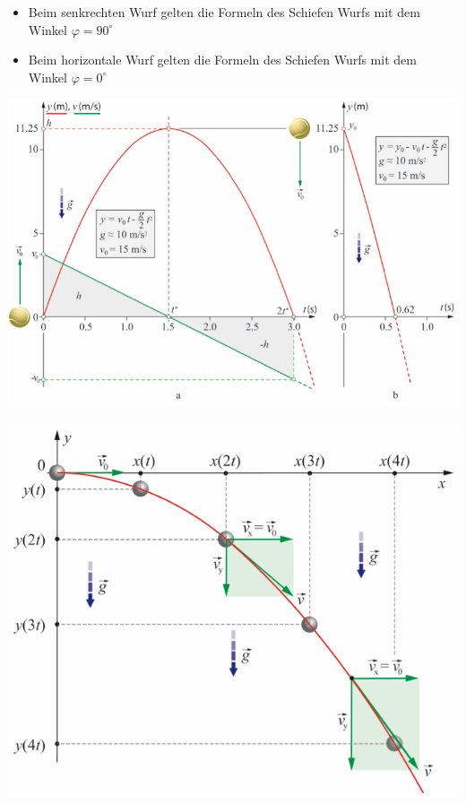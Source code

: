\begin{itemize}
	\item Beim senkrechten Wurf gelten die Formeln des Schiefen Wurfs mit dem Winkel $\varphi = 90^\circ$
	\item Beim horizontale Wurf gelten die Formeln des Schiefen Wurfs mit dem Winkel $\varphi = 0^\circ$
\end{itemize}

\begin{minipage}[h!]{0.5\linewidth}
\includegraphics[width=0.9\linewidth]{images/senkrechter_wurf}
\end{minipage}
\hfill
\begin{minipage}[hbt]{0.5\linewidth}
\includegraphics[width=0.9\linewidth]{images/horizontaler_wurf}
\end{minipage}

